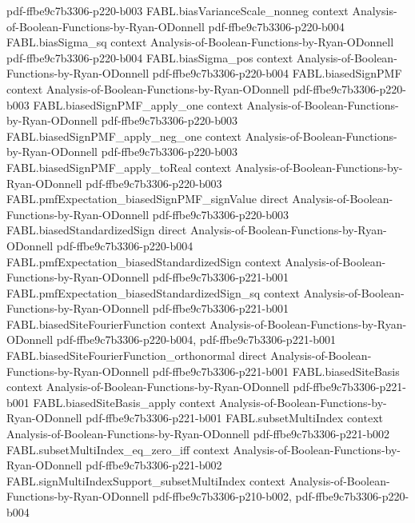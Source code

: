 \begin{theorem}
  {pdf-ffbe9c7b3306-p220-b003}
\proofstep
  {FABL.biasVarianceScale_nonneg}
  {context}
  {Analysis-of-Boolean-Functions-by-Ryan-ODonnell}
  {pdf-ffbe9c7b3306-p220-b004}
\proofstep
  {FABL.biasSigma_sq}
  {context}
  {Analysis-of-Boolean-Functions-by-Ryan-ODonnell}
  {pdf-ffbe9c7b3306-p220-b004}
\proofstep
  {FABL.biasSigma_pos}
  {context}
  {Analysis-of-Boolean-Functions-by-Ryan-ODonnell}
  {pdf-ffbe9c7b3306-p220-b004}
\proofstep
  {FABL.biasedSignPMF}
  {context}
  {Analysis-of-Boolean-Functions-by-Ryan-ODonnell}
  {pdf-ffbe9c7b3306-p220-b003}
\proofstep
  {FABL.biasedSignPMF_apply_one}
  {context}
  {Analysis-of-Boolean-Functions-by-Ryan-ODonnell}
  {pdf-ffbe9c7b3306-p220-b003}
\proofstep
  {FABL.biasedSignPMF_apply_neg_one}
  {context}
  {Analysis-of-Boolean-Functions-by-Ryan-ODonnell}
  {pdf-ffbe9c7b3306-p220-b003}
\proofstep
  {FABL.biasedSignPMF_apply_toReal}
  {context}
  {Analysis-of-Boolean-Functions-by-Ryan-ODonnell}
  {pdf-ffbe9c7b3306-p220-b003}
\proofstep
  {FABL.pmfExpectation_biasedSignPMF_signValue}
  {direct}
  {Analysis-of-Boolean-Functions-by-Ryan-ODonnell}
  {pdf-ffbe9c7b3306-p220-b003}
\proofstep
  {FABL.biasedStandardizedSign}
  {direct}
  {Analysis-of-Boolean-Functions-by-Ryan-ODonnell}
  {pdf-ffbe9c7b3306-p220-b004}
\proofstep
  {FABL.pmfExpectation_biasedStandardizedSign}
  {context}
  {Analysis-of-Boolean-Functions-by-Ryan-ODonnell}
  {pdf-ffbe9c7b3306-p221-b001}
\proofstep
  {FABL.pmfExpectation_biasedStandardizedSign_sq}
  {context}
  {Analysis-of-Boolean-Functions-by-Ryan-ODonnell}
  {pdf-ffbe9c7b3306-p221-b001}
\proofstep
  {FABL.biasedSiteFourierFunction}
  {context}
  {Analysis-of-Boolean-Functions-by-Ryan-ODonnell}
  {pdf-ffbe9c7b3306-p220-b004,
    pdf-ffbe9c7b3306-p221-b001}
\proofstep
  {FABL.biasedSiteFourierFunction_orthonormal}
  {direct}
  {Analysis-of-Boolean-Functions-by-Ryan-ODonnell}
  {pdf-ffbe9c7b3306-p221-b001}
\proofstep
  {FABL.biasedSiteBasis}
  {context}
  {Analysis-of-Boolean-Functions-by-Ryan-ODonnell}
  {pdf-ffbe9c7b3306-p221-b001}
\proofstep
  {FABL.biasedSiteBasis_apply}
  {context}
  {Analysis-of-Boolean-Functions-by-Ryan-ODonnell}
  {pdf-ffbe9c7b3306-p221-b001}
\proofstep
  {FABL.subsetMultiIndex}
  {context}
  {Analysis-of-Boolean-Functions-by-Ryan-ODonnell}
  {pdf-ffbe9c7b3306-p221-b002}
\proofstep
  {FABL.subsetMultiIndex_eq_zero_iff}
  {context}
  {Analysis-of-Boolean-Functions-by-Ryan-ODonnell}
  {pdf-ffbe9c7b3306-p221-b002}
\proofstep
  {FABL.signMultiIndexSupport_subsetMultiIndex}
  {context}
  {Analysis-of-Boolean-Functions-by-Ryan-ODonnell}
  {pdf-ffbe9c7b3306-p210-b002,
    pdf-ffbe9c7b3306-p220-b004}

\end{theorem}
